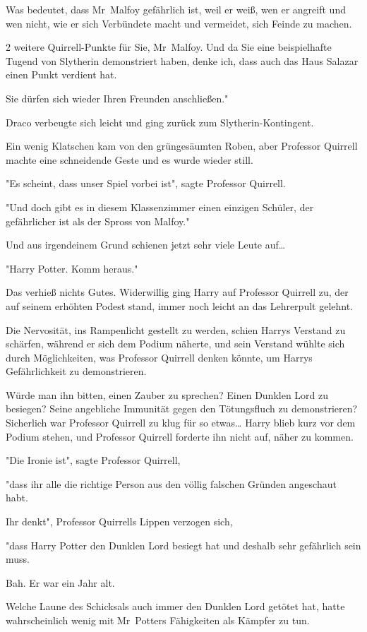 {Was bedeutet, dass Mr~Malfoy gefährlich ist, weil er weiß, wen er angreift und wen nicht, wie er sich Verbündete macht und vermeidet, sich Feinde zu machen.

2 weitere Quirrell-Punkte für Sie, Mr~Malfoy. Und da Sie eine beispielhafte Tugend von Slytherin demonstriert haben, denke ich, dass auch das Haus Salazar einen Punkt verdient hat.

Sie dürfen sich wieder Ihren Freunden anschließen."

Draco verbeugte sich leicht und ging zurück zum Slytherin-Kontingent.

Ein wenig Klatschen kam von den grüngesäumten Roben, aber Professor Quirrell machte eine schneidende Geste und es wurde wieder still.

"Es scheint, dass unser Spiel vorbei ist", sagte Professor Quirrell.

"Und doch gibt es in diesem Klassenzimmer einen einzigen Schüler, der gefährlicher ist als der Spross von Malfoy."

Und aus irgendeinem Grund schienen jetzt sehr viele Leute auf…

"Harry Potter. Komm heraus."

Das verhieß nichts Gutes. Widerwillig ging Harry auf Professor Quirrell zu, der auf seinem erhöhten Podest stand, immer noch leicht an das Lehrerpult gelehnt.

Die Nervosität, ins Rampenlicht gestellt zu werden, schien Harrys Verstand zu schärfen, während er sich dem Podium näherte, und sein Verstand wühlte sich durch Möglichkeiten, was Professor Quirrell denken könnte, um Harrys Gefährlichkeit zu demonstrieren.

Würde man ihn bitten, einen Zauber zu sprechen? Einen Dunklen Lord zu besiegen? Seine angebliche Immunität gegen den Tötungsfluch zu demonstrieren? Sicherlich war Professor Quirrell zu klug für so etwas… Harry blieb kurz vor dem Podium stehen, und Professor Quirrell forderte ihn nicht auf, näher zu kommen.

"Die Ironie ist", sagte Professor Quirrell,

"dass ihr alle die richtige Person aus den völlig falschen Gründen angeschaut habt.

Ihr denkt", Professor Quirrells Lippen verzogen sich,

"dass Harry Potter den Dunklen Lord besiegt hat und deshalb sehr gefährlich sein muss.

Bah. Er war ein Jahr alt.

Welche Laune des Schicksals auch immer den Dunklen Lord getötet hat, hatte wahrscheinlich wenig mit Mr~Potters Fähigkeiten als Kämpfer zu tun.

}

